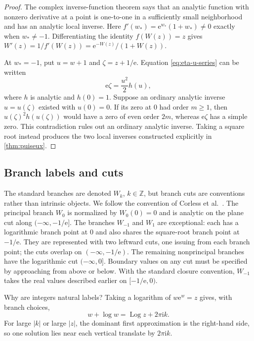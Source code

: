 \documentclass[11pt]{article}
\numberwithin{equation}{section}
\theoremstyle{definition}
\theoremstyle{remark}
\newcommand{\e}{\mathrm e}
\newcommand{\ii}{\mathrm i}
\newcommand{\Log}{\operatorname{Log}}
\begin{document}
\begin{proof}
The complex inverse-function theorem says that an analytic function with
nonzero derivative at a point is one-to-one in a sufficiently small
neighborhood and has an analytic local inverse.  Here
$f'(w_*)=\e^{w_*}(1+w_*)\ne0$ exactly when $w_*\ne-1$.
Differentiating the identity $f(W(z))=z$ gives
$W'(z)=1/f'(W(z))=\e^{-W(z)}/(1+W(z))$.

At $w_*=-1$, put $u=w+1$ and $\zeta=z+1/\e$.  Equation
\eqref{eq:eta-u-series} can be written
\[
  \e\zeta=\frac{u^2}{2}h(u),
\]
where $h$ is analytic and $h(0)=1$.  Suppose an ordinary analytic inverse
$u=u(\zeta)$ existed with $u(0)=0$.  If its zero at $0$ had order $m\ge1$,
then $u(\zeta)^2h(u(\zeta))$ would have a zero of even order $2m$, whereas
$\e\zeta$ has a simple zero.  This contradiction rules out an ordinary
analytic inverse.  Taking a square root instead produces the two local
inverses constructed explicitly in \cref{thm:puiseux}.
\end{proof}

\subsection{Branch labels and cuts}

The standard branches are denoted $W_k$, $k\in\mathbb Z$, but branch cuts
are conventions rather than intrinsic objects.  We follow the convention of
Corless et al.\ \cite{Corless1996}.  The principal branch $W_0$ is normalized
by $W_0(0)=0$ and is analytic on the plane cut along
$(-\infty,-1/\e]$.  The branches $W_{-1}$ and $W_1$ are exceptional: each has
a logarithmic branch point at $0$ and also shares the square-root branch point
at $-1/\e$.  They are represented with two leftward cuts, one issuing from
each branch point; the cuts overlap on $(-\infty,-1/\e)$.  The remaining
nonprincipal branches have the logarithmic cut $(-\infty,0]$.  Boundary values
on any cut must be specified by approaching from above or below.  With the
standard closure convention, $W_{-1}$ takes the real values described earlier
on $[-1/\e,0)$.

Why are integers natural labels?  Taking a logarithm of
$w\e^w=z$ gives, with branch choices,
\begin{equation}
  w+\log w=\Log z+2\pi\ii k.                           \label{eq:complex-log-equation}
\end{equation}
For large $|k|$ or large $|z|$, the dominant first approximation is the
right-hand side, so one solution lies near each vertical translate by
$2\pi\ii k$.
\end{document}
